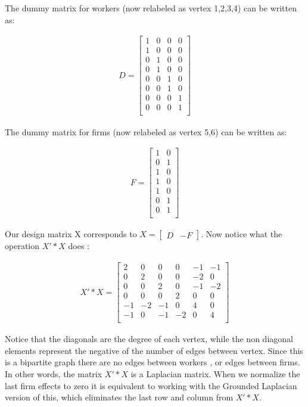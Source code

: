 \documentclass[12pt]{article}
\begin{document}
The dummy matrix for workers (now relabeled as vertex 1,2,3,4) can be written as: 

\begin{align*}
D = \begin{bmatrix}
1 & 0 & 0& 0\\
1 & 0 & 0& 0\\
0 & 1 & 0& 0\\
0 & 1 & 0& 0\\
0 & 0 & 1& 0\\
0 & 0 & 1& 0\\
0 & 0 & 0& 1\\
0 & 0 & 0& 1\\
\end{bmatrix} 
\end{align*}


The dummy matrix for firms (now relabeled as vertex 5,6) can be written as: 

\begin{align*}
F = \begin{bmatrix}
1 & 0 \\
0 & 1 \\
1 & 0 \\
1 & 0 \\
1 & 0 \\
0 & 1 \\
0 & 1 \\
\end{bmatrix} 
\end{align*}

Our design matrix X corresponds to  $X = \begin{bmatrix} D & -F \end{bmatrix}$. Now notice what the operation $X'*X$ does : 

\begin{align*}
X'*X = \begin{bmatrix}
2 & 0 & 0 & 0 & -1 & -1 \\
0 & 2 & 0 & 0 & -2 & 0 \\
0 & 0 & 2 & 0 & -1 & -2 \\
0 & 0 & 0 & 2 & 0 & 0 \\
-1 & -2 & -1 & 0 & 4 & 0 \\
-1 & 0 & -1 & -2 & 0 & 4 \\
\end{bmatrix} 
\end{align*}

Notice that the diagonals are the degree of each vertex, while the non diagonal elements represent the negative of the number of edges between vertex. Since this is a bipartite graph there are no edges between workers , or edges between firms.  In other words, the matrix $X'*X$ is a Laplacian matrix. When we normalize the last firm effects to zero it is equivalent to working with the Grounded Laplacian version of this, which eliminates the last row and column from $X'*X$.
\end{document}
